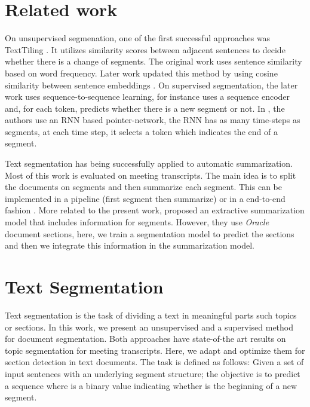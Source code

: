 \documentclass[sigconf]{acmart}
\begin{document}
\section{Related work}\label{sec:bck}


On unsupervised segmenation, one of the first successful approaches was TextTiling \cite{hearst-1997-text}. It utilizes similarity scores between adjacent sentences to decide whether there is a change of segments. The original work uses sentence similarity based on word frequency. Later work updated this method by using cosine similarity between sentence embeddings \cite{xu2021topicaware, solbiati2021unsupervised}. On supervised segmentation, the later work uses sequence-to-sequence learning, for instance \cite{liu-etal-2022-end} uses a sequence encoder and, for each token, predicts whether there is a new segment or not. In \cite{ijcai2018-579}, the authors use an RNN based pointer-network, the RNN has as many time-steps as segments, at each time step, it selects a token which indicates the end of a segment. 

Text segmentation has being successfully applied to automatic summarization. Most of this work is evaluated on meeting transcripts. The main idea is to split the documents on segments and then summarize each segment. This can be implemented in a pipeline (first segment then summarize) or in a end-to-end fashion \cite{liu-etal-2022-end, liu2019topic}. More related to the present work, \cite{ruan-etal-2022-histruct} proposed an extractive summarization model that includes information for segments. However, they use \emph{Oracle} document sections, here, we train a segmentation model to predict the sections and then we integrate this information in the summarization model. 

\section{Text Segmentation}\label{sec:seg}
Text segmentation is the task of dividing a text in meaningful parts such topics or sections. In this work, we present an unsupervised and a supervised method for document segmentation. Both approaches have state-of-the art results on topic segmentation for meeting transcripts. Here, we adapt and optimize them for section detection in text documents. 
The task is defined as follows: Given a set of input sentences  with an underlying segment structure; the objective is to predict a sequence  where  is a binary value indicating whether  is the beginning of a new segment. 
\end{document}
